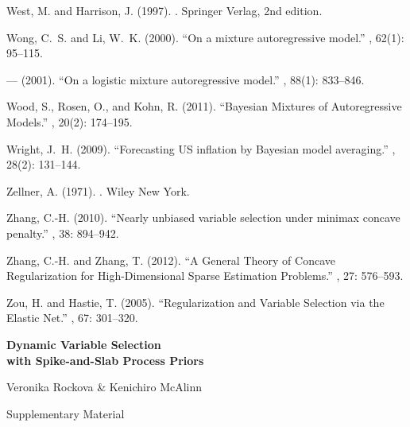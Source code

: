 \documentclass[ba]{imsart}
\numberwithin{equation}{section}
\theoremstyle{plain}
\begin{document}
\begin{thebibliography}{70}
West, M. and Harrison, J. (1997).
.
\newblock Springer Verlag, 2nd edition.
\endbibitem

Wong, C.~S. and Li, W.~K. (2000).
\newblock \enquote{{On a mixture autoregressive model}.}
, 62(1):
  95--115.
\endbibitem

--- (2001).
\newblock \enquote{{On a logistic mixture autoregressive model}.}
, 88(1): 833--846.
\endbibitem

Wood, S., Rosen, O., and Kohn, R. (2011).
\newblock \enquote{Bayesian Mixtures of Autoregressive Models.}
, 20(2):
  174--195.
\endbibitem

Wright, J.~H. (2009).
\newblock \enquote{Forecasting US inflation by Bayesian model averaging.}
, 28(2): 131--144.
\endbibitem

Zellner, A. (1971).
.
\newblock Wiley New York.
\endbibitem

Zhang, C.-H. (2010).
\newblock \enquote{{Nearly unbiased variable selection under minimax concave
  penalty}.}
, 38: 894--942.
\endbibitem

Zhang, C.-H. and Zhang, T. (2012).
\newblock \enquote{A General Theory of Concave Regularization for
  High-Dimensional Sparse Estimation Problems.}
, 27: 576--593.
\endbibitem

Zou, H. and Hastie, T. (2005).
\newblock \enquote{Regularization and Variable Selection via the Elastic Net.}
, 67:
  301--320.
\endbibitem

\end{thebibliography}



\clearpage
\setcounter{page}{1}
\begin{center}
{\bf\LARGE Dynamic Variable Selection \\with Spike-and-Slab Process Priors} 

\bigskip
{\Large Veronika Rockova \& Kenichiro McAlinn} 

\bigskip
{\large  Supplementary Material} 

\bigskip\bigskip
\end{center}
\end{document}
